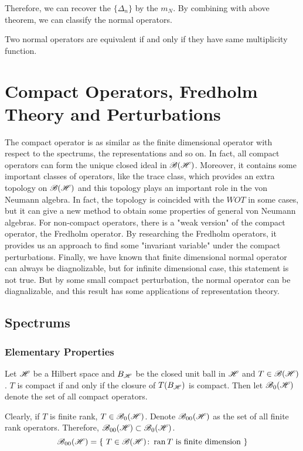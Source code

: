 \documentclass[a4paper,11pt]{report}
\begin{document}
Therefore, we can recover the $\{\Delta_n\}$ by the $m_N$. By combining with above theorem, we can classify the normal operators.

\begin{thm}
	Two normal operators are equivalent if and only if they have same multiplicity function.
\end{thm}

\chapter{Compact Operators, Fredholm Theory and Perturbations}

The compact operator is as similar as the finite dimensional operator with respect to the spectrums, the representations and so on. In fact, all compact operators can form the unique closed ideal in $\mathscr{B(H)}$. Moreover, it contains some important classes of operators, like the trace class, which provides an extra topology on $\mathscr{B(H)}$ and this topology plays an important role in the von Neumann algebra. In fact, the topology is coincided with the $WOT$ in some cases, but it can give a new method to obtain some properties of general von Neumann algebras. For non-compact operators, there is a "weak version" of the compact operator, the Fredholm operator. By researching the Fredholm operators, it provides us an approach to find some "invariant variable" under the compact perturbations. Finally, we have known that finite dimensional normal operator can always be diagnolizable, but for infinite dimensional case, this statement is not true. But by some small compact perturbation, the normal operator can be diagnalizable, and this result has some applications of representation theory. 

\section{Spectrums}

\subsection{Elementary Properties}

\begin{defn}
	Let $\mathscr{H}$ be a Hilbert space and $B_{\mathscr{H}}$ be the closed unit ball in $\mathscr{H}$ and $T \in \mathscr{B(H)}$. $T$ is compact if and only if the closure of $T(B_{\mathscr{H}})$ is compact. Then let $\mathscr{B}_{0}\mathscr{(H)}$ denote the set of all compact operators.
\end{defn}
\begin{rem}
	Clearly, if $T$ is finite rank, $T \in \mathscr{B}_{0}\mathscr{(H)}$. Denote $\mathscr{B}_{00}\mathscr{(H)}$ as the set of all finite rank operators. Therefore, $\mathscr{B}_{00}\mathscr{(H)} \subset \mathscr{B}_{0}\mathscr{(H)}$.
	\begin{equation*}
		\mathscr{B}_{00}\mathscr{(H)} = \{~T \in \mathscr{B(H)} \colon \operatorname{ran}{T} \text{ is finite dimension}~\}
	\end{equation*}
\end{rem}
\end{document}
